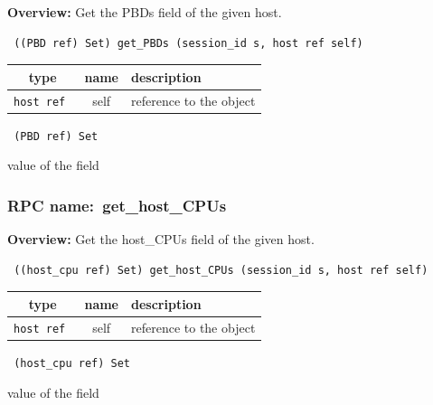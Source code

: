 {\bf Overview:} 
Get the PBDs field of the given host.

\begin{verbatim} ((PBD ref) Set) get_PBDs (session_id s, host ref self)\end{verbatim}



 
\vspace{0.3cm}
\begin{tabular}{|c|c|p{7cm}|}
 \hline
{\bf type} & {\bf name} & {\bf description} \\ \hline
{\tt host ref } & self & reference to the object \\ \hline 

\end{tabular}

\vspace{0.3cm}

{\tt 
(PBD ref) Set
}


value of the field
\vspace{0.3cm}
\vspace{0.3cm}
\vspace{0.3cm}
\subsubsection{RPC name:~get\_host\_CPUs}

{\bf Overview:} 
Get the host\_CPUs field of the given host.

\begin{verbatim} ((host_cpu ref) Set) get_host_CPUs (session_id s, host ref self)\end{verbatim}



 
\vspace{0.3cm}
\begin{tabular}{|c|c|p{7cm}|}
 \hline
{\bf type} & {\bf name} & {\bf description} \\ \hline
{\tt host ref } & self & reference to the object \\ \hline 

\end{tabular}

\vspace{0.3cm}

{\tt 
(host\_cpu ref) Set
}


value of the field
\vspace{0.3cm}
\vspace{0.3cm}
\vspace{0.3cm}
